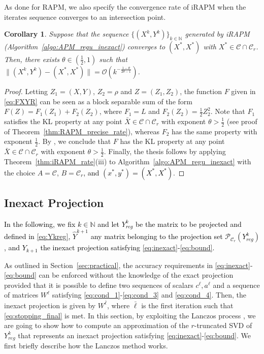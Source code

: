 \documentclass[pdflatex,sn-mathphys-num]{sn-jnl}
\numberwithin{equation}{section}%
\def\N{\mathbb{N}}
\newcommand{\Yck}{{Y_{reg}^k}}
\newcommand{\setRank}{{\mathcal{C}_r}}
\newcommand{\setNorm}{{\mathcal{C} }}
\newcommand{\REV}[1]{\textcolor{black}{#1}}
\newcommand{\ste}[1]{\textcolor{black}{#1}}
\theoremstyle{thmstyleone}%
\newtheorem{corollary}[theorem]{Corollary}%
\theoremstyle{thmstyletwo}%
\theoremstyle{thmstylethree}%
\begin{document}
{As done for RAPM, we also specify the convergence rate of iRAPM when the iterates sequence converges to an intersection point.

\begin{corollary}\label{thm:iRAPM_precise_rate}
Suppose that the sequence $\{(X^k,Y^k)\}_{k\in\N}$ generated by iRAPM (Algorithm~\ref{algo:APM_regu_inexact}) converges to $(X^*,X^*)$ with $X^*\in \mathcal{C}\cap \mathcal{C}_r$. Then, there exists $\theta\in (\frac{1}{2},1)$ such that $\|(X^k,Y^k)-(X^*,X^*)\|=\mathcal{O}(k^{-\frac{1-\theta}{2\theta-1}})$.
\end{corollary}

\begin{proof}
Letting $Z_1 = (X,Y)$, $Z_2 = \rho$ and $Z=(Z_1,Z_2)$, the function $F$ given in \eqref{eq:FXYR} can be seen as a block separable sum of the form $F(Z) = F_1(Z_1)+F_2(Z_2)$, where $F_1=L$ and $F_2(Z_2)=\frac{1}{2}Z_2^2$. Note that $F_1$ satisfies the KL property at any point $\bar{X}\in\mathcal{C}\cap\mathcal{C}_r$ with exponent $\theta>\frac{1}{2}$ (see proof of Theorem~\ref{thm:RAPM_precise_rate}), whereas $F_2$ has the same property with exponent $\frac{1}{2}$. By \cite[Theorem 3.3]{Li2018}, we conclude that $F$ has the KL property at any point $\bar{X}\in\mathcal{C}\cap\mathcal{C}_r$ with exponent $\theta>\frac{1}{2}$. Finally, the thesis follows by applying Theorem~\ref{thm:iRAPM_rate}(iii) to Algorithm~\ref{algo:APM_regu_inexact} with the choice $A=\setNorm$, $B=\setRank$\ste{, and $(x^*,y^*) = (X^*,X^*)$}.     
\end{proof}}

\subsection{Inexact Projection} \label{sec:Lanczos} 
\REV{In the following, we fix $k\in\mathbb{N}$ and let $Y_{reg}^k$ be the matrix to be projected and defined in \eqref{eq:Ykreg}, $\hat{Y}^{k+1}$ any matrix belonging to the projection set $\mathcal{P}_{\mathcal{C}_r}(Y_{reg}^k)$, and $Y_{k+1}$ the inexact projection satisfying \eqref{eq:inexact}-\eqref{eq:bound}.}

{As outlined in Section~\ref{sec:practical}, the accuracy requirements in \eqref{eq:inexact}-\eqref{eq:bound} can be enforced without the knowledge of the exact projection provided that it is possible to define two sequences of scalars $c^\ell, a^\ell$ and a sequence of matrices $W^\ell$ satisfying \eqref{eq:cond_1}-\eqref{eq:cond_3} {and \eqref{eq:cond_4}}. Then,  the inexact projection is given by  $W^{\bar \ell}$, where $\bar \ell$ is the first iteration such that  \eqref{eq:stopping_final} is met.
In this section, by exploiting  the Lanczos process \cite{saad2011numerical,larsen1998lanczos}, we are going to show how to  compute an approximation of the  $r$-truncated SVD of $\Yck$ that represents an inexact projection satisfying
\eqref{eq:inexact}-\eqref{eq:bound}.
We first  briefly describe how the Lanczos method works. }
\end{document}
